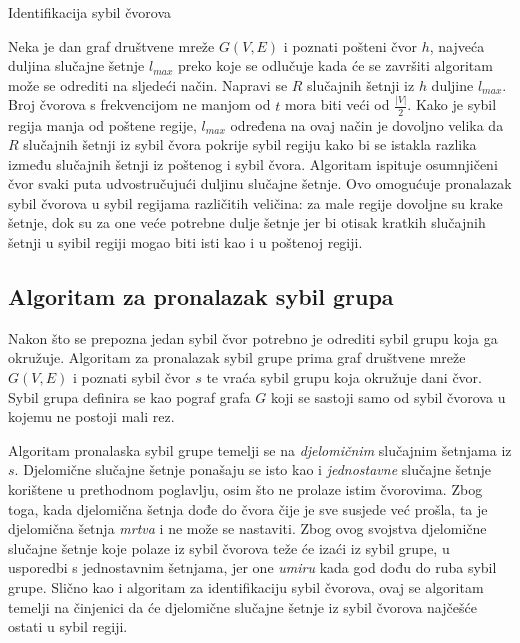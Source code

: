 \documentclass[times, utf8, seminar, numeric]{fer}
\begin{document}
\begin{algorithm}[h]
	\caption{Identifikacija sybil čvorova}
	\label{alg:identify2}

  
\end{algorithm}

Neka je dan graf društvene mreže $G(V, E)$ i poznati pošteni čvor $h$, najveća duljina slučajne šetnje $l_{max}$ preko koje se odlučuje kada će se završiti algoritam može se odrediti na sljedeći način. Napravi se $R$ slučajnih šetnji iz $h$ duljine $l_{max}$. Broj čvorova s frekvencijom ne manjom od $t$ mora biti veći od $\frac{|V|}{2}$. Kako je sybil regija manja od poštene regije, $l_{max}$ određena na ovaj način je dovoljno velika da $R$ slučajnih šetnji iz sybil čvora pokrije sybil regiju kako bi se istakla razlika između slučajnih šetnji iz poštenog i sybil čvora. Algoritam ispituje osumnjičeni čvor svaki puta udvostručujući duljinu slučajne šetnje. Ovo omogućuje pronalazak sybil čvorova u sybil regijama različitih veličina: za male regije dovoljne su krake šetnje, dok su za one veće potrebne dulje šetnje jer bi otisak kratkih slučajnih šetnji u syibil regiji mogao biti isti kao i u poštenoj regiji.

\subsection{Algoritam za pronalazak sybil grupa}
Nakon što se prepozna jedan sybil čvor potrebno je odrediti sybil grupu koja ga okružuje. Algoritam za pronalazak sybil grupe prima graf društvene mreže $G(V, E)$ i poznati sybil čvor $s$ te vraća sybil grupu koja okružuje dani čvor. Sybil grupa definira se kao pograf grafa $G$ koji se sastoji samo od sybil čvorova u kojemu ne postoji mali rez.

Algoritam pronalaska sybil grupe temelji se na \textit{djelomičnim} slučajnim šetnjama iz $s$. Djelomične slučajne šetnje ponašaju se isto kao i \textit{jednostavne} slučajne šetnje korištene u prethodnom poglavlju, osim što ne prolaze istim čvorovima. Zbog toga, kada djelomična šetnja dođe do čvora čije je sve susjede već prošla, ta je djelomična šetnja \textit{mrtva} i ne može se nastaviti. Zbog ovog svojstva djelomične slučajne šetnje koje polaze iz sybil čvorova teže će izaći iz sybil grupe, u usporedbi s jednostavnim šetnjama, jer one \textit{umiru} kada god dođu do ruba sybil grupe. Slično kao i algoritam za identifikaciju sybil čvorova, ovaj se algoritam temelji na činjenici da će djelomične slučajne šetnje iz sybil čvorova najčešće ostati u sybil regiji.
\end{document}
